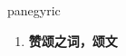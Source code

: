
\begin{frame}
{\huge panegyric}
\begin{center}
\begin{enumerate}\Large
  \item \textbf{赞颂之词，颂文}
\end{enumerate}
\end{center}
\end{frame}
